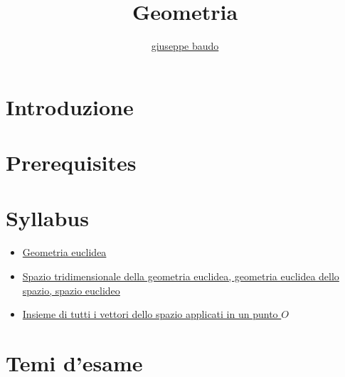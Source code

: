 \documentclass[a4paper,10pt]{article}
\title{Geometria}
\author{\href{http://www.baudo.hol.es}{giuseppe baudo}}
\begin{document}
\maketitle


\section{Introduzione}

\section{Prerequisites}

\section{Syllabus}
  \begin{itemize}
   \item \href{./GeometriaEuclidea.html}{Geometria euclidea}
   \item \href{./GeometriaEuclidea3d.html}{Spazio tridimensionale della geometria euclidea, geometria euclidea dello spazio, spazio euclideo}
   \item \href{./InsiemeVettoriApplicati.html}{Insieme di tutti i vettori dello spazio applicati in un punto $O$}
  \end{itemize}

\section{Temi d'esame}
\end{document}
